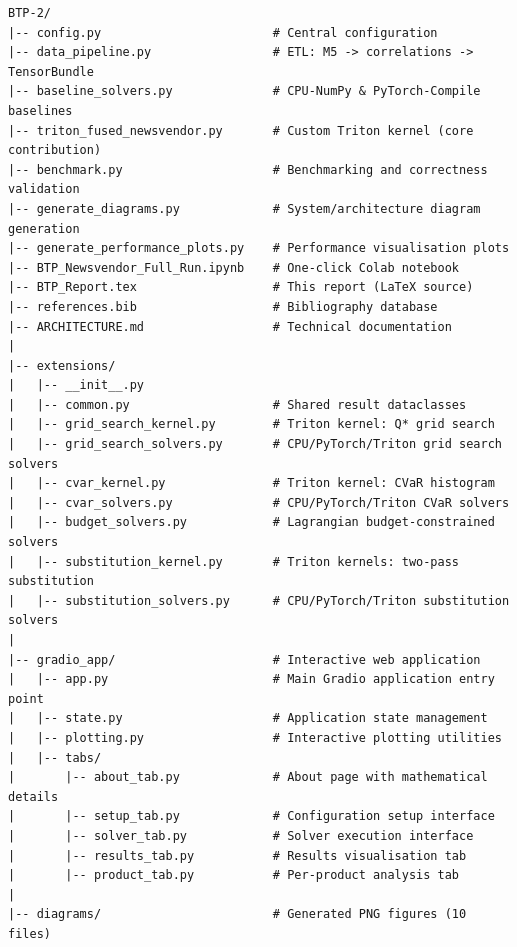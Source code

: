
\begin{lstlisting}[basicstyle=\ttfamily\small, frame=none, numbers=none, xleftmargin=0em]
BTP-2/
|-- config.py                        # Central configuration
|-- data_pipeline.py                 # ETL: M5 -> correlations -> TensorBundle
|-- baseline_solvers.py              # CPU-NumPy & PyTorch-Compile baselines
|-- triton_fused_newsvendor.py       # Custom Triton kernel (core contribution)
|-- benchmark.py                     # Benchmarking and correctness validation
|-- generate_diagrams.py             # System/architecture diagram generation
|-- generate_performance_plots.py    # Performance visualisation plots
|-- BTP_Newsvendor_Full_Run.ipynb    # One-click Colab notebook
|-- BTP_Report.tex                   # This report (LaTeX source)
|-- references.bib                   # Bibliography database
|-- ARCHITECTURE.md                  # Technical documentation
|
|-- extensions/
|   |-- __init__.py
|   |-- common.py                    # Shared result dataclasses
|   |-- grid_search_kernel.py        # Triton kernel: Q* grid search
|   |-- grid_search_solvers.py       # CPU/PyTorch/Triton grid search solvers
|   |-- cvar_kernel.py               # Triton kernel: CVaR histogram
|   |-- cvar_solvers.py              # CPU/PyTorch/Triton CVaR solvers
|   |-- budget_solvers.py            # Lagrangian budget-constrained solvers
|   |-- substitution_kernel.py       # Triton kernels: two-pass substitution
|   |-- substitution_solvers.py      # CPU/PyTorch/Triton substitution solvers
|
|-- gradio_app/                      # Interactive web application
|   |-- app.py                       # Main Gradio application entry point
|   |-- state.py                     # Application state management
|   |-- plotting.py                  # Interactive plotting utilities
|   |-- tabs/
|       |-- about_tab.py             # About page with mathematical details
|       |-- setup_tab.py             # Configuration setup interface
|       |-- solver_tab.py            # Solver execution interface
|       |-- results_tab.py           # Results visualisation tab
|       |-- product_tab.py           # Per-product analysis tab
|
|-- diagrams/                        # Generated PNG figures (10 files)
\end{lstlisting}
